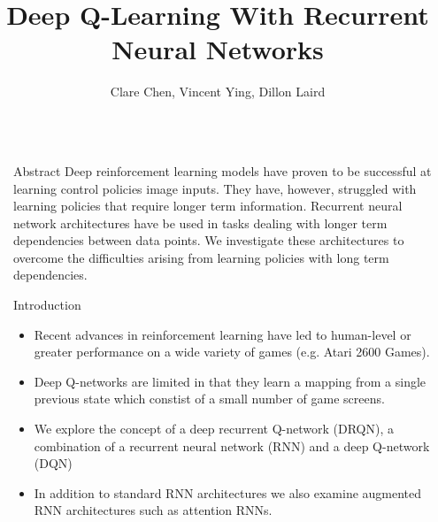 \documentclass[final]{beamer}
\title{Deep Q-Learning With Recurrent Neural Networks} %
\author{Clare Chen, Vincent Ying, Dillon Laird} %
\institute{Stanford, 2016} %
\newlength{\sepwid}
\newlength{\onecolwid}
\begin{document}

\setlength{\belowcaptionskip}{2ex} %
\setlength\belowdisplayshortskip{2ex} %

\begin{frame}[t] %

\begin{columns}[t] %

\begin{column}{\sepwid}\end{column} %

\begin{column}{\onecolwid} %


\begin{alertblock}{Abstract}
    Deep reinforcement learning models have proven to be successful at learning
    control policies image inputs. They have, however, struggled with learning
    policies that require longer term information. Recurrent neural network
    architectures have be used in tasks dealing with longer term dependencies
    between data points. We investigate these architectures to overcome the
    difficulties arising from learning policies with long term dependencies.
\end{alertblock}


\begin{block}{Introduction}
    \begin{itemize}
        \item Recent advances in reinforcement learning have led to human-level
              or greater performance on a wide variety of games (e.g. Atari 2600
              Games). 
        \item Deep Q-networks are limited in that they learn a mapping from a single
              previous state which constist of a small number of game screens.
        \item We explore the concept of a deep recurrent Q-network (DRQN), a
              combination of a recurrent neural network (RNN) and a deep
              Q-network (DQN) 
        \item In addition to standard RNN architectures we also examine augmented RNN
              architectures such as attention RNNs. 
    \end{itemize}
\end{block}


\end{column}
\end{columns}
\end{frame}
\end{document}
